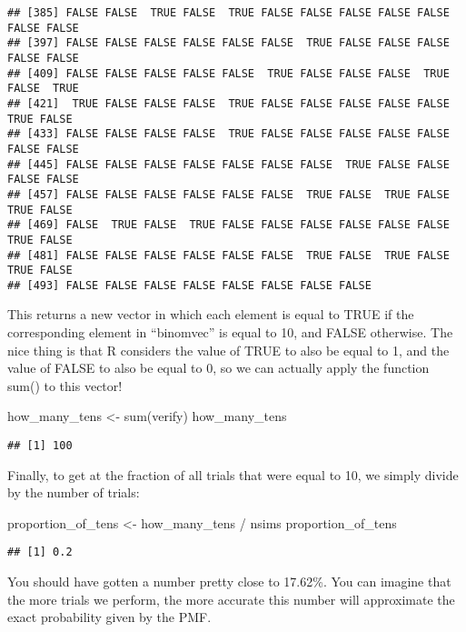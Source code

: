\documentclass[
]{book}
\newenvironment{Shaded}{\begin{snugshade}}{\end{snugshade}}
\newcommand{\FunctionTok}[1]{\textcolor[rgb]{0.00,0.00,0.00}{#1}}
\newcommand{\NormalTok}[1]{#1}
\newcommand{\OtherTok}[1]{\textcolor[rgb]{0.56,0.35,0.01}{#1}}
\newcommand{\SpecialCharTok}[1]{\textcolor[rgb]{0.00,0.00,0.00}{#1}}
\begin{document}
\begin{verbatim}
## [385] FALSE FALSE  TRUE FALSE  TRUE FALSE FALSE FALSE FALSE FALSE FALSE FALSE
## [397] FALSE FALSE FALSE FALSE FALSE FALSE  TRUE FALSE FALSE FALSE FALSE FALSE
## [409] FALSE FALSE FALSE FALSE FALSE  TRUE FALSE FALSE FALSE  TRUE FALSE  TRUE
## [421]  TRUE FALSE FALSE FALSE  TRUE FALSE FALSE FALSE FALSE FALSE  TRUE FALSE
## [433] FALSE FALSE FALSE FALSE  TRUE FALSE FALSE FALSE FALSE FALSE FALSE FALSE
## [445] FALSE FALSE FALSE FALSE FALSE FALSE FALSE  TRUE FALSE FALSE FALSE FALSE
## [457] FALSE FALSE FALSE FALSE FALSE FALSE  TRUE FALSE  TRUE FALSE  TRUE FALSE
## [469] FALSE  TRUE FALSE  TRUE FALSE FALSE FALSE FALSE FALSE FALSE  TRUE FALSE
## [481] FALSE FALSE FALSE FALSE FALSE FALSE  TRUE FALSE  TRUE FALSE  TRUE FALSE
## [493] FALSE FALSE FALSE FALSE FALSE FALSE FALSE FALSE
\end{verbatim}

This returns a new vector in which each element is equal to TRUE if the corresponding element in ``binomvec'' is equal to 10, and FALSE otherwise. The nice thing is that R considers the value of TRUE to also be equal to 1, and the value of FALSE to also be equal to 0, so we can actually apply the function sum() to this vector!

\begin{Shaded}
\begin{Highlighting}[]
\NormalTok{how\_many\_tens }\OtherTok{\textless{}{-}} \FunctionTok{sum}\NormalTok{(verify)}
\NormalTok{how\_many\_tens}
\end{Highlighting}
\end{Shaded}

\begin{verbatim}
## [1] 100
\end{verbatim}

Finally, to get at the fraction of all trials that were equal to 10, we simply divide by the number of trials:

\begin{Shaded}
\begin{Highlighting}[]
\NormalTok{proportion\_of\_tens }\OtherTok{\textless{}{-}}\NormalTok{ how\_many\_tens }\SpecialCharTok{/}\NormalTok{ nsims}
\NormalTok{proportion\_of\_tens}
\end{Highlighting}
\end{Shaded}

\begin{verbatim}
## [1] 0.2
\end{verbatim}

You should have gotten a number pretty close to 17.62\%. You can imagine that the more trials we perform, the more accurate this number will approximate the exact probability given by the PMF.
\end{document}
